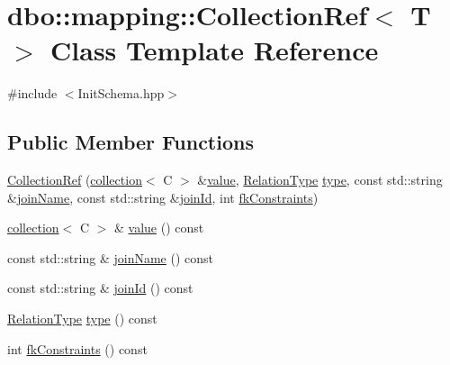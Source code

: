 \hypertarget{classdbo_1_1mapping_1_1_collection_ref}{\section{dbo\+:\+:mapping\+:\+:Collection\+Ref$<$ T $>$ Class Template Reference}
\label{classdbo_1_1mapping_1_1_collection_ref}
}


{\ttfamily \#include $<$Init\+Schema.\+hpp$>$}

\subsection*{Public Member Functions}
\begin{DoxyCompactItemize}
\item 
\hyperlink{classdbo_1_1mapping_1_1_collection_ref_a02c5398579ea8fa05dd4da464cabdb53}{Collection\+Ref} (\hyperlink{classdbo_1_1collection}{collection}$<$ C $>$ \&\hyperlink{classdbo_1_1mapping_1_1_collection_ref_a98e75fab5685237cd98010b2eaaec038}{value}, \hyperlink{namespacedbo_ab7f92e64aea13b1e3b60021e72a9fc73}{Relation\+Type} \hyperlink{classdbo_1_1mapping_1_1_collection_ref_a0ced72627731d2ff12e1beff3cb08818}{type}, const std\+::string \&\hyperlink{classdbo_1_1mapping_1_1_collection_ref_aadd0a42fc1af4bc4e8b093b2f252fa0c}{join\+Name}, const std\+::string \&\hyperlink{classdbo_1_1mapping_1_1_collection_ref_a3b28d10c4c356c0a19e67567f7b40d1c}{join\+Id}, int \hyperlink{classdbo_1_1mapping_1_1_collection_ref_ae4ca9ae45a8f5887a94a3db1ad6d27bc}{fk\+Constraints})
\item 
\hyperlink{classdbo_1_1collection}{collection}$<$ C $>$ \& \hyperlink{classdbo_1_1mapping_1_1_collection_ref_a98e75fab5685237cd98010b2eaaec038}{value} () const 
\item 
const std\+::string \& \hyperlink{classdbo_1_1mapping_1_1_collection_ref_aadd0a42fc1af4bc4e8b093b2f252fa0c}{join\+Name} () const 
\item 
const std\+::string \& \hyperlink{classdbo_1_1mapping_1_1_collection_ref_a3b28d10c4c356c0a19e67567f7b40d1c}{join\+Id} () const 
\item 
\hyperlink{namespacedbo_ab7f92e64aea13b1e3b60021e72a9fc73}{Relation\+Type} \hyperlink{classdbo_1_1mapping_1_1_collection_ref_a0ced72627731d2ff12e1beff3cb08818}{type} () const 
\item 
int \hyperlink{classdbo_1_1mapping_1_1_collection_ref_ae4ca9ae45a8f5887a94a3db1ad6d27bc}{fk\+Constraints} () const 
\end{DoxyCompactItemize}


